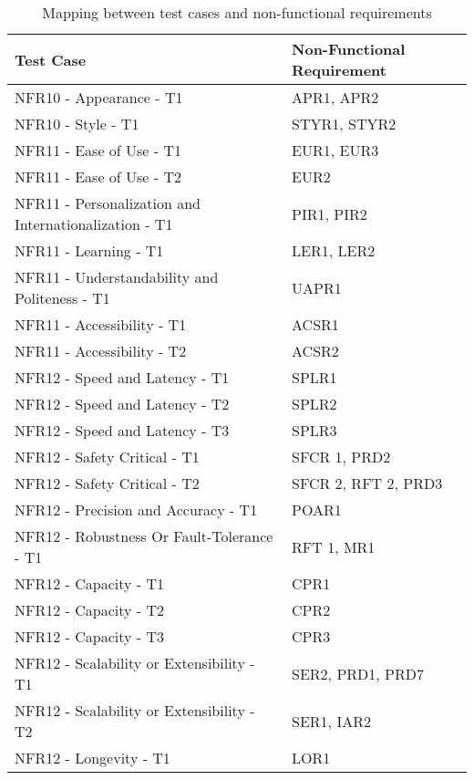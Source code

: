 \documentclass[12pt, titlepage]{article}
\begin{document}
\begin{table}
\begin{tabularx}{\textwidth}{p{7cm}p{7cm}}
\toprule {\bf Test Case} & {\bf Non-Functional Requirement}\\
\midrule
{NFR10 - Appearance -  T1} & {APR1, APR2} \\
{NFR10 - Style - T1} & {STYR1, STYR2} \\
{NFR11 - Ease of Use - T1} & {EUR1, EUR3} \\
{NFR11 - Ease of Use - T2} & {EUR2} \\
{NFR11 - Personalization and Internationalization - T1} & {PIR1, PIR2} \\
{NFR11 - Learning - T1} & {LER1, LER2} \\
{NFR11 - Understandability and Politeness - T1} & {UAPR1} \\
{NFR11 - Accessibility - T1} & {ACSR1} \\
{NFR11 - Accessibility - T2} & {ACSR2} \\
{NFR12 - Speed and Latency - T1} & {SPLR1} \\
{NFR12 - Speed and Latency - T2} & {SPLR2} \\
{NFR12 - Speed and Latency - T3} & {SPLR3} \\
{NFR12 - Safety Critical - T1} & {SFCR 1, PRD2} \\
{NFR12 - Safety Critical - T2} & {SFCR 2, RFT 2, PRD3} \\
{NFR12 - Precision and Accuracy - T1} & {POAR1} \\
{NFR12 - Robustness Or Fault-Tolerance - T1} & {RFT 1, MR1} \\
{NFR12 - Capacity - T1} & {CPR1} \\
{NFR12 - Capacity - T2} & {CPR2} \\
{NFR12 - Capacity - T3} & {CPR3} \\
{NFR12 - Scalability or Extensibility - T1} & {SER2, PRD1, PRD7} \\
{NFR12 - Scalability or Extensibility - T2} & {SER1, IAR2} \\
{NFR12 - Longevity - T1} & {LOR1} \\

\bottomrule
\end{tabularx}
\caption{Mapping between test cases and non-functional requirements}
\end{table}
\end{document}
